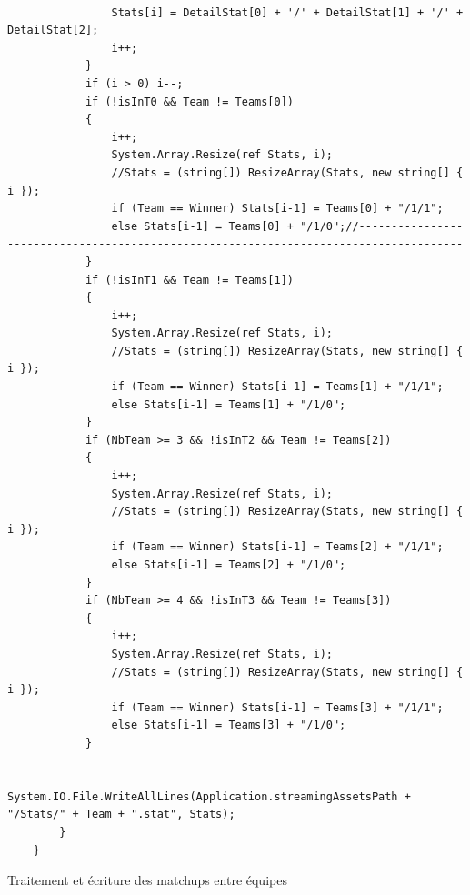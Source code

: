 \documentclass{report}
\begin{document}
\begin{lstlisting}[frame=single]
                
                Stats[i] = DetailStat[0] + '/' + DetailStat[1] + '/' + DetailStat[2];
                i++;
            }
            if (i > 0) i--;
            if (!isInT0 && Team != Teams[0])
            {
                i++;
                System.Array.Resize(ref Stats, i);
                //Stats = (string[]) ResizeArray(Stats, new string[] { i });
                if (Team == Winner) Stats[i-1] = Teams[0] + "/1/1";
                else Stats[i-1] = Teams[0] + "/1/0";//--------------------------------------------------------------------------------------
            }
            if (!isInT1 && Team != Teams[1])
            {
                i++;
                System.Array.Resize(ref Stats, i);
                //Stats = (string[]) ResizeArray(Stats, new string[] { i });
                if (Team == Winner) Stats[i-1] = Teams[1] + "/1/1";
                else Stats[i-1] = Teams[1] + "/1/0";
            }
            if (NbTeam >= 3 && !isInT2 && Team != Teams[2])
            {
                i++;
                System.Array.Resize(ref Stats, i);
                //Stats = (string[]) ResizeArray(Stats, new string[] { i });
                if (Team == Winner) Stats[i-1] = Teams[2] + "/1/1";
                else Stats[i-1] = Teams[2] + "/1/0";
            }
            if (NbTeam >= 4 && !isInT3 && Team != Teams[3])
            {
                i++;
                System.Array.Resize(ref Stats, i);
                //Stats = (string[]) ResizeArray(Stats, new string[] { i });
                if (Team == Winner) Stats[i-1] = Teams[3] + "/1/1";
                else Stats[i-1] = Teams[3] + "/1/0";
            }
    
            System.IO.File.WriteAllLines(Application.streamingAssetsPath + "/Stats/" + Team + ".stat", Stats);
        }
    }
\end{lstlisting}
 {Traitement et écriture des matchups entre équipes}
\end{document}
